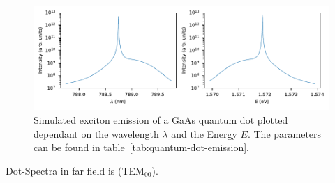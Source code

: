 \begin{figure}[H]
	\centering
	\includegraphics{figures/fabry-perot/plots/quantum_dot_emission_wavelength_energy}
	\caption[Simulated exciton emission of a GaAs quantum dot]{Simulated exciton emission of a GaAs quantum dot plotted dependant on the wavelength $\lambda$ and the Energy $E$.
		The parameters can be found in table~\ref{tab:quantum-dot-emission}.}
	\label{fig:quantumdotemissionwavelengthenergy}
\end{figure}


Dot-Spectra in far field is (TEM$_{00}$).



